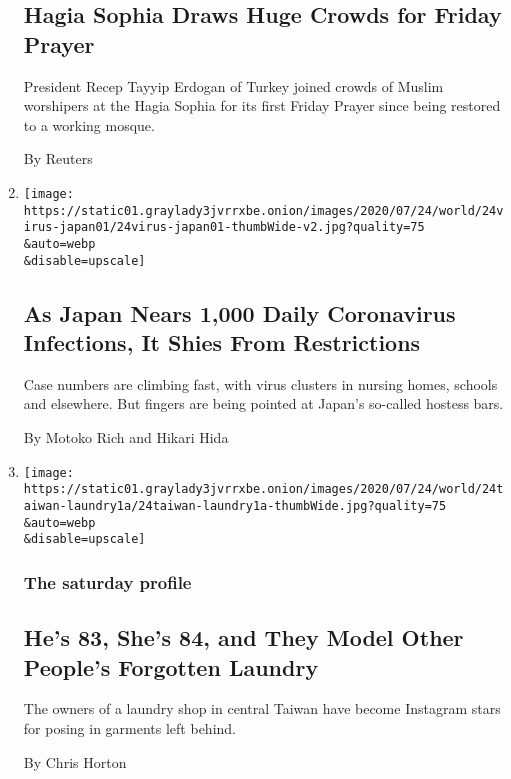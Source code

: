 \begin{enumerate}
  \hypertarget{hagia-sophia-draws-huge-crowds-for-friday-prayer}{%
  \subsection{Hagia Sophia Draws Huge Crowds for Friday
  Prayer}\label{hagia-sophia-draws-huge-crowds-for-friday-prayer}}

  President Recep Tayyip Erdogan of Turkey joined crowds of Muslim
  worshipers at the Hagia Sophia for its first Friday Prayer since being
  restored to a working mosque.

  By Reuters
\item
  \href{/2020/07/24/world/asia/japan-coronavirus.html}{}

  \texttt{[image: https://static01.graylady3jvrrxbe.onion/images/2020/07/24/world/24virus-japan01/24virus-japan01-thumbWide-v2.jpg?quality=75\\\&auto=webp\\\&disable=upscale]}

  \hypertarget{as-japan-nears-1000-daily-coronavirus-infections-it-shies-from-restrictions}{%
  \subsection{As Japan Nears 1,000 Daily Coronavirus Infections, It
  Shies From
  Restrictions}\label{as-japan-nears-1000-daily-coronavirus-infections-it-shies-from-restrictions}}

  Case numbers are climbing fast, with virus clusters in nursing homes,
  schools and elsewhere. But fingers are being pointed at Japan's
  so-called hostess bars.

  By Motoko Rich and Hikari Hida
\item
  \href{/2020/07/24/world/asia/taiwan-octogenarian-couple-instagram-laundry.html}{}

  \texttt{[image: https://static01.graylady3jvrrxbe.onion/images/2020/07/24/world/24taiwan-laundry1a/24taiwan-laundry1a-thumbWide.jpg?quality=75\\\&auto=webp\\\&disable=upscale]}

  \hypertarget{the-saturday-profile}{%
  \subsubsection{The saturday profile}\label{the-saturday-profile}}

  \hypertarget{hes-83-shes-84-and-they-model-other-peoples-forgotten-laundry}{%
  \subsection{He's 83, She's 84, and They Model Other People's Forgotten
  Laundry}\label{hes-83-shes-84-and-they-model-other-peoples-forgotten-laundry}}

  The owners of a laundry shop in central Taiwan have become Instagram
  stars for posing in garments left behind.

  By Chris Horton
\end{enumerate}


